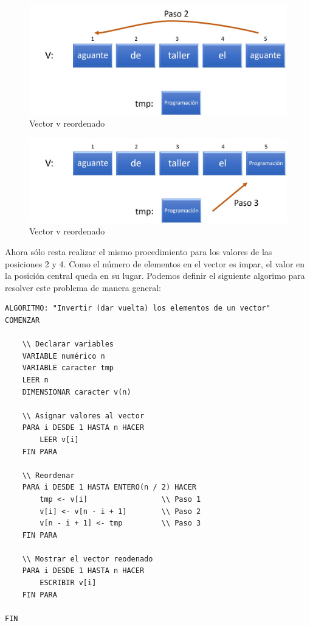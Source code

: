 \documentclass[]{book}
\begin{document}
\begin{figure}

{\centering \includegraphics[width=0.8\linewidth]{images/17_invertir} 

}

\caption{Vector v reordenado}\label{fig:inv4}
\end{figure}

\begin{figure}

{\centering \includegraphics[width=0.8\linewidth]{images/18_invertir} 

}

\caption{Vector v reordenado}\label{fig:inv5}
\end{figure}

Ahora sólo resta realizar el mismo procedimiento para los valores de las
posiciones 2 y 4. Como el número de elementos en el vector es impar, el
valor en la posición central queda en su lugar. Podemos definir el
siguiente algorimo para resolver este problema de manera general:

\begin{verbatim}
ALGORITMO: "Invertir (dar vuelta) los elementos de un vector"
COMENZAR
    
    \\ Declarar variables
    VARIABLE numérico n
    VARIABLE caracter tmp
    LEER n
    DIMENSIONAR caracter v(n)
    
    \\ Asignar valores al vector
    PARA i DESDE 1 HASTA n HACER
        LEER v[i]
    FIN PARA
    
    \\ Reordenar
    PARA i DESDE 1 HASTA ENTERO(n / 2) HACER
        tmp <- v[i]                 \\ Paso 1
        v[i] <- v[n - i + 1]        \\ Paso 2
        v[n - i + 1] <- tmp         \\ Paso 3
    FIN PARA
    
    \\ Mostrar el vector reodenado
    PARA i DESDE 1 HASTA n HACER
        ESCRIBIR v[i]
    FIN PARA
    
FIN
\end{verbatim}
\end{document}
